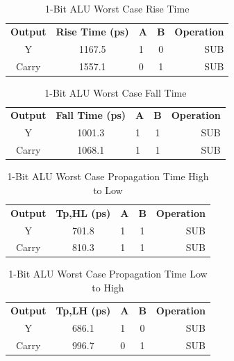 \documentclass[11pt]{article}
\begin{document}
			\begin{table}[H]
				\centering
				\caption{1-Bit ALU Worst Case Rise Time}
				\label{tab:ALU-1-Bit-Risetime}
				\begin{tabular}{|cclcr|}
					\hline
					\textbf{Output} & \textbf{Rise Time (ps)} & \textbf{A} & \textbf{B} & \textbf{Operation} \\
					Y               & 1167.5                  & 1          & 0          & SUB                \\
					Carry           & 1557.1                  & 0          & 1          & SUB                \\
					         \hline
				\end{tabular}
			\end{table}
		
		
			\begin{table}[H]
				\centering
				\caption{1-Bit ALU Worst Case Fall Time}
				\label{tab:ALU-1-Bit-Falltime}
				\begin{tabular}{|cclcr|}
					\hline
					\textbf{Output} & \textbf{Fall Time (ps)} & \textbf{A} & \textbf{B} & \textbf{Operation} \\
					Y               & 1001.3                  & 1          & 1          & SUB                \\
					Carry           & 1068.1                  & 1          & 1          & SUB                \\
					\hline
				\end{tabular}
			\end{table}
		
		
			\begin{table}[H]
				\centering
				\caption{1-Bit ALU Worst Case Propagation Time High to Low}
				\label{tab:ALU-1-Bit-Tpd-HL}
				\begin{tabular}{|cclcr|}
					\hline
					\textbf{Output} & \textbf{Tp,HL (ps)} & \textbf{A} & \textbf{B} & \textbf{Operation} \\
					Y               & 701.8                   & 1          & 1          & SUB                \\
					Carry           & 810.3                   & 1          & 1          & SUB                \\
					\hline
				\end{tabular}
			\end{table}
		
			\begin{table}[H]
				\centering
				\caption{1-Bit ALU Worst Case Propagation Time Low to High}
				\label{tab:ALU-1-Bit-Tpd-LH}
				\begin{tabular}{|cclcr|}
					\hline
					\textbf{Output} & \textbf{Tp,LH (ps)} & \textbf{A} & \textbf{B} & \textbf{Operation} \\
					Y               & 686.1                   & 1          & 0          & SUB                \\
					Carry           & 996.7                   & 0          & 1          & SUB                \\
					\hline
				\end{tabular}
			\end{table}
		
\end{document}
